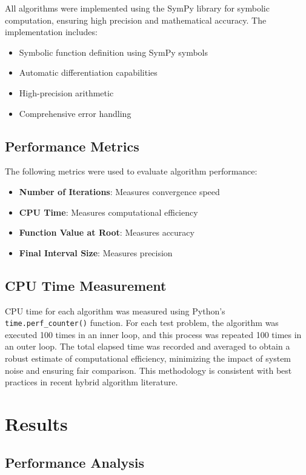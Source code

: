 \documentclass[11pt,a4paper]{article}
\begin{document}
All algorithms were implemented using the SymPy library for symbolic computation, ensuring high precision and mathematical accuracy. The implementation includes:

\begin{itemize}
    \item Symbolic function definition using SymPy symbols
    \item Automatic differentiation capabilities
    \item High-precision arithmetic
    \item Comprehensive error handling
\end{itemize}

\subsection{Performance Metrics}

The following metrics were used to evaluate algorithm performance:

\begin{itemize}
    \item \textbf{Number of Iterations}: Measures convergence speed
    \item \textbf{CPU Time}: Measures computational efficiency
    \item \textbf{Function Value at Root}: Measures accuracy
    \item \textbf{Final Interval Size}: Measures precision
\end{itemize}

\subsection{CPU Time Measurement}

CPU time for each algorithm was measured using Python's \texttt{time.perf\_counter()} function. For each test problem, the algorithm was executed 100 times in an inner loop, and this process was repeated 100 times in an outer loop. The total elapsed time was recorded and averaged to obtain a robust estimate of computational efficiency, minimizing the impact of system noise and ensuring fair comparison. This methodology is consistent with best practices in recent hybrid algorithm literature.

\section{Results}

\subsection{Performance Analysis}
\end{document}
